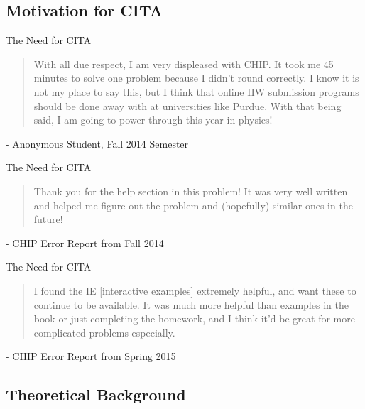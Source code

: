 \documentclass[xcolor=x11names,compress]{beamer}
\begin{document}
\subsection{Motivation for CITA}

\begin{frame}{The Need for CITA}
	\begin{quote}
	With all due respect, I am very displeased with CHIP.  It took me 45 minutes to solve one problem because I didn't round correctly.  I know it is not my place to say this, but I think that online HW submission programs should be done away with at universities like Purdue.  With that being said, I am going to power through this year in physics!
	\end{quote}
	\vspace{5mm}
	- Anonymous Student, Fall 2014 Semester
\end{frame}

\begin{frame}{The Need for CITA}
	\begin{quote}
	Thank you for the help section in this problem! It was very well written and helped me figure out the problem and (hopefully) similar ones in the future!
	\end{quote}
	\vspace{5mm}
	- CHIP Error Report from Fall 2014
\end{frame}

\begin{frame}{The Need for CITA}
	\begin{quote}
	I found the IE [interactive examples] extremely helpful, and want these to continue to be available. It was much more helpful than examples in the book or just completing the homework, and I think it'd be great for more complicated problems especially.
	\end{quote}
	\vspace{5mm}
	- CHIP Error Report from Spring 2015
\end{frame}

\subsection{Theoretical Background}
\end{document}

